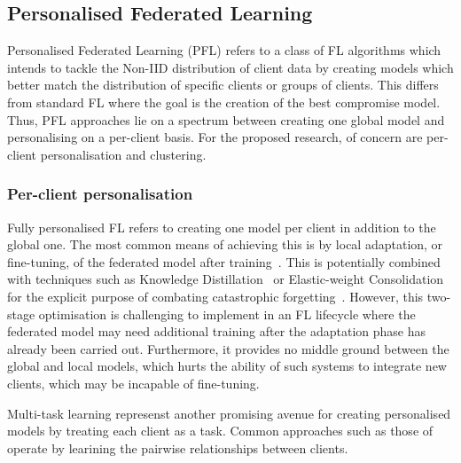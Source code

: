 \subsection{Personalised Federated Learning}

Personalised Federated Learning (PFL) refers to a class of FL algorithms which intends to tackle the Non-IID distribution of client data by creating models which better match the distribution of specific clients or groups of clients. This differs from standard FL where the goal is the creation of the best compromise model. Thus, PFL approaches lie on a spectrum between creating one global model and personalising on a per-client basis. For the proposed research, of concern are per-client personalisation and clustering.

\subsubsection{Per-client personalisation}

Fully personalised FL refers to creating one model per client in addition to the global one. The most common means of achieving this is by local adaptation, or fine-tuning, of the federated model after training~\citep{SalvagingFL}. This is potentially combined with techniques such as Knowledge Distillation~\citep{DeepMutualLearning} or Elastic-weight Consolidation~\citep{kirkpatrick2017overcoming} for the explicit purpose of combating catastrophic forgetting~\citep{CatForgetting1}. However, this two-stage optimisation is challenging to implement in an FL lifecycle where the federated model may need additional training after the adaptation phase has already been carried out. Furthermore, it provides no middle ground between the global and local models, which hurts the ability of such systems to integrate new clients, which may be incapable of fine-tuning.


Multi-task learning represenst another promising avenue for creating personalised models by treating each client as a task. Common approaches such as those of  operate by learining the pairwise relationships between clients.

